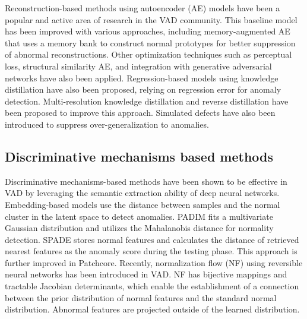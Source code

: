 \documentclass[journal]{IEEEtran}
\begin{document}
Reconstruction-based methods using autoencoder (AE) models have been a popular and active area of research in the VAD community. This baseline model has been improved with various approaches, including memory-augmented AE\cite{r4}\cite{r8} that uses a memory bank to construct normal prototypes for better suppression of abnormal reconstructions. Other optimization techniques such as perceptual loss\cite{r9}, structural similarity AE\cite{r10}, and integration with generative adversarial networks have also been applied. Regression-based models using knowledge distillation\cite{r6} have also been proposed, relying on regression error for anomaly detection. Multi-resolution knowledge distillation\cite{r11} and reverse distillation\cite{r12} have been proposed to improve this approach. Simulated defects\cite{r13} have also been introduced to suppress over-generalization to anomalies.


\subsection{Discriminative mechanisms based methods}


Discriminative mechanisms-based methods have been shown to be effective in VAD by leveraging the semantic extraction ability of deep neural networks. Embedding-based models use the distance between samples and the normal cluster in the latent space to detect anomalies. PADIM\cite{r14} fits a multivariate Gaussian distribution and utilizes the Mahalanobis distance for normality detection. SPADE\cite{r15} stores normal features and calculates the distance of retrieved nearest features as the anomaly score during the testing phase. This approach is further improved in Patchcore\cite{r5}. Recently, normalization flow (NF)\cite{r16} using reversible neural networks has been introduced in VAD\cite{r17}\cite{r7}. NF has bijective mappings and tractable Jacobian determinants, which enable the establishment of a connection between the prior distribution of normal features and the standard normal distribution. Abnormal features are projected outside of the learned distribution.





\end{document}
